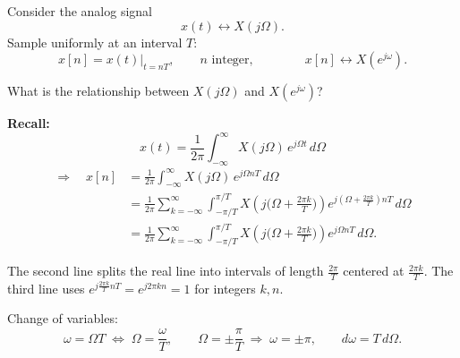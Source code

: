 \documentclass[handout_subfiles_root.tex]{subfiles}
\begin{document}
\maketitle


\noindent Consider the analog signal
\begin{equation*}
x(t) \longleftrightarrow X(j\Omega).
\end{equation*}
Sample uniformly at an interval $T$:
\begin{equation*}
x[n] = x(t)\big|_{t=nT}, \qquad n \text{ integer},
\qquad\qquad
x[n] \longleftrightarrow X(e^{j\omega}).
\end{equation*}

\begin{factbox}[title={Question}]
What is the relationship between $X(j\Omega)$ and $X(e^{j\omega})$?
\end{factbox}

\noindent\textbf{Recall:}
\begin{equation*}
x(t) = \frac{1}{2\pi}\int_{-\infty}^{\infty} X(j\Omega)\,e^{j\Omega t}\,d\Omega
\end{equation*}
\begin{align*}
\Rightarrow\quad x[n] &= \frac{1}{2\pi}\int_{-\infty}^{\infty} X(j\Omega)\,e^{j\Omega nT}\,d\Omega \\
&= \frac{1}{2\pi}\sum_{k=-\infty}^{\infty}\int_{-\pi/T}^{\pi/T} X\!\left(j\Big(\Omega+\frac{2\pi k}{T}\Big)\right) e^{j\left(\Omega+\frac{2\pi k}{T}\right)nT}\,d\Omega \\
&= \frac{1}{2\pi}\sum_{k=-\infty}^{\infty}\int_{-\pi/T}^{\pi/T} X\!\left(j\Big(\Omega+\frac{2\pi k}{T}\Big)\right) e^{j\Omega nT}\,d\Omega.
\end{align*}

\begin{notebox}[title=\HandoutNoteAddendumTitle]
The second line splits the real line into intervals of length $\tfrac{2\pi}{T}$ centered at $\tfrac{2\pi k}{T}$. The third line uses $e^{j\frac{2\pi k}{T}nT} = e^{j2\pi kn} = 1$ for integers $k,n$.
\end{notebox}

\noindent Change of variables:
\begin{equation*}
\omega = \Omega T \;\Longleftrightarrow\; \Omega = \frac{\omega}{T},
\qquad
\Omega = \pm\frac{\pi}{T} \;\Rightarrow\; \omega = \pm\pi,
\qquad
d\omega = T\,d\Omega.
\end{equation*}
\end{document}
